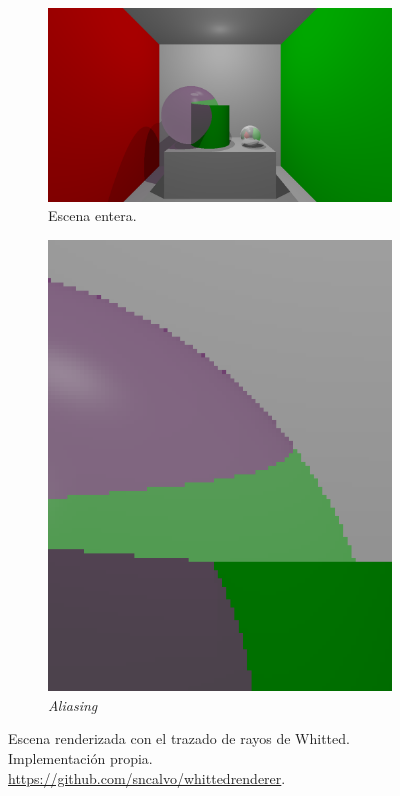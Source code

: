 \begin{figure}
    \begin{center}
    \begin{subfigure}{.69\textwidth}
        \includegraphics[width=\textwidth]{whitted-ray-tracing.png}
        \caption{Escena entera.}
    \end{subfigure}
    \begin{subfigure}{.3\textwidth}
        \includegraphics[width=\textwidth]{whitted-aliasing.png}
        \caption{\textit{Aliasing}}
        \label{fig:whitted-ray-tracing-aliasing}
    \end{subfigure}
    \caption{Escena renderizada con el trazado de rayos de Whitted. Implementación propia. \url{https://github.com/sncalvo/whittedrenderer}.}
    \label{fig:whitted-ray-tracing}
    \end{center}
\end{figure}

